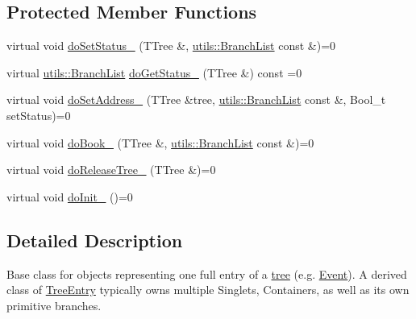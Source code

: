 \subsection*{Protected Member Functions}
\begin{DoxyCompactItemize}
\item 
virtual void \hyperlink{classpanda_1_1TreeEntry_a8c17222accba71d53b73ad6e2c3276a2}{doSetStatus\_\-} (TTree \&, \hyperlink{classpanda_1_1utils_1_1BranchList}{utils::BranchList} const \&)=0
\item 
virtual \hyperlink{classpanda_1_1utils_1_1BranchList}{utils::BranchList} \hyperlink{classpanda_1_1TreeEntry_a649d4a6f2719b68d54c6a7505f5f3105}{doGetStatus\_\-} (TTree \&) const =0
\item 
virtual void \hyperlink{classpanda_1_1TreeEntry_abdb184144bf5a4ca8b0fdb6d06c5d4c1}{doSetAddress\_\-} (TTree \&tree, \hyperlink{classpanda_1_1utils_1_1BranchList}{utils::BranchList} const \&, Bool\_\-t setStatus)=0
\item 
virtual void \hyperlink{classpanda_1_1TreeEntry_a62e77d9db1eec7032b1e31e5edc78a10}{doBook\_\-} (TTree \&, \hyperlink{classpanda_1_1utils_1_1BranchList}{utils::BranchList} const \&)=0
\item 
virtual void \hyperlink{classpanda_1_1TreeEntry_a44e70436de0dc8088885895ea0011a2d}{doReleaseTree\_\-} (TTree \&)=0
\item 
virtual void \hyperlink{classpanda_1_1TreeEntry_ab78cd4dfd6c017222db541580983fb65}{doInit\_\-} ()=0
\end{DoxyCompactItemize}


\subsection{Detailed Description}
Base class for objects representing one full entry of a \hyperlink{namespacepanda_1_1tree}{tree} (e.g. \hyperlink{classpanda_1_1Event}{Event}). A derived class of \hyperlink{classpanda_1_1TreeEntry}{TreeEntry} typically owns multiple Singlets, Containers, as well as its own primitive branches. 

